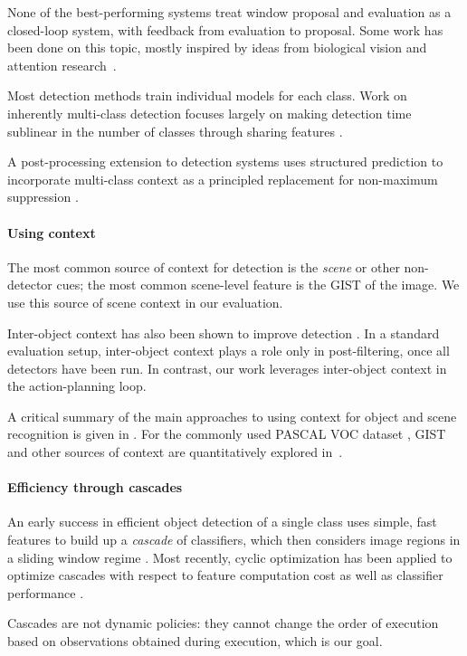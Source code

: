 None of the best-performing systems treat window proposal and evaluation as a closed-loop system, with feedback from evaluation to proposal.
Some work has been done on this topic, mostly inspired by ideas from biological vision and attention research~\cite{Butko2009,Vogel2008}.

Most detection methods train individual models for each class.
Work on inherently multi-class detection focuses largely on making detection time sublinear in the number of classes through sharing features \cite{Torralba2007,Fan2005}.

A post-processing extension to detection systems uses structured prediction to incorporate multi-class context as a principled replacement for non-maximum suppression \cite{Desai2009}.

\paragraph{Using context}
The most common source of context for detection is the \emph{scene} or other non-detector cues; the most common scene-level feature is the GIST \cite{Oliva-IJCV-2001} of the image.
We use this source of scene context in our evaluation.

Inter-object context has also been shown to improve detection \cite{Torralba2004}.
In a standard evaluation setup, inter-object context plays a role only in post-filtering, once all detectors have been run.
In contrast, our work leverages inter-object context in the action-planning loop.

A critical summary of the main approaches to using context for object and scene recognition is given in \cite{Galleguillos2010}.
For the commonly used PASCAL VOC dataset \cite{pascal-voc-2010}, GIST and other sources of context are quantitatively explored in~\cite{Divvala2009}.

\paragraph{Efficiency through cascades}
An early success in efficient object detection of a single class uses simple, fast features to build up a \emph{cascade} of classifiers, which then considers image regions in a sliding window regime \cite{Viola2004}.
Most recently, cyclic optimization has been applied to optimize cascades with respect to feature computation cost as well as classifier performance \cite{Chen-AISTATS-2012}.

Cascades are not dynamic policies: they cannot change the order of execution based on observations obtained during execution, which is our goal.

